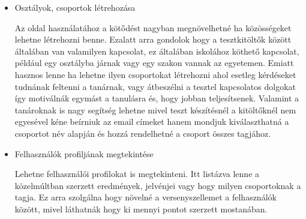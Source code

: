 \begin{itemize}
\begin{addmargin}[\parindent]{0pt}
          \end{addmargin}
    \item {Osztályok, csoportok létrehozása}
          \begin{addmargin}[\parindent]{0pt}
              Az oldal használatához a kötődést nagyban megnövelhetné ha közösségeket lehetne létrehozni benne. Ezalatt arra gondolok hogy a tesztkitöltők között általában van valamilyen kapcsolat, ez általában iskolához köthető kapcsolat, például egy osztályba járnak vagy egy szakon vannak az egyetemen. Emiatt hasznos lenne ha lehetne ilyen csoportokat létrehozni ahol esetleg kérdéseket tudnának feltenni a tanárnak, vagy átbeszélni a tesztel kapcsolatos dolgokat így motiválnák egymást a tanulásra és, hogy jobban teljesítsenek. Valamint a tanároknak is nagy segítség lehetne mivel teszt készítésnél a kitöltőknél nem egyesével kéne beírniuk az email címeket hanem mondjuk kiválaszthatná a csoportot név alapján és hozzá rendelhetné a csoport összes tagjához.
          \end{addmargin}
    \item {Felhasználók profiljának megtekintése}
          \begin{addmargin}[\parindent]{0pt}
              Lehetne felhasználói profilokat is megtekinteni. Itt listázva lenne a közelmúltban szerzett eredmények, jelvénjei vagy hogy milyen csoportoknak a tagja. Ez arra szolgálna hogy növelné a versenyszellemet a felhasználók között, mivel láthatnák hogy ki mennyi pontot szerzett mostanában.
          \end{addmargin}

\end{itemize}